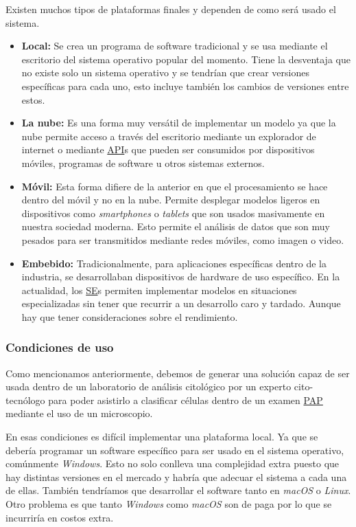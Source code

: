 Existen muchos tipos de plataformas finales y dependen de como será usado
el sistema. 

\begin{itemize}
    \item{\textbf{Local: }} Se crea un programa de software tradicional y se usa
    mediante el escritorio del sistema operativo popular del momento. Tiene la
    desventaja que no existe solo un sistema operativo y se tendrían que crear
    versiones específicas para cada uno, esto incluye también los cambios de
    versiones entre estos.
    \item{\textbf{La nube: }} Es una forma muy versátil de implementar un modelo
    ya que la nube permite acceso a través del escritorio mediante un explorador
    de internet o mediante \hyperlink{abbr}{API}s que pueden ser consumidos por
    dispositivos móviles, programas de software u otros sistemas externos.
    \item{\textbf{Móvil: }} Esta forma difiere de la anterior en que el
    procesamiento se hace dentro del móvil y no en la nube. Permite desplegar
    modelos ligeros en dispositivos como \emph{smartphones} o \emph{tablets} que
    son usados masivamente en nuestra sociedad moderna. Esto permite el análisis
    de datos que son muy pesados para ser transmitidos mediante redes móviles,
    como imagen o video.
    \item{\textbf{Embebido: }} Tradicionalmente, para aplicaciones específicas
    dentro de la industria, se desarrollaban dispositivos de hardware de uso
    específico. En la actualidad, los \hyperlink{abbr}{SE}s permiten implementar
    modelos en situaciones especializadas sin tener que recurrir a un desarrollo
    caro y tardado. Aunque hay que tener consideraciones sobre el rendimiento.
\end{itemize}

\subsubsection{Condiciones de uso}
Como mencionamos anteriormente, debemos de generar una solución capaz de ser
usada dentro de un laboratorio de análisis citológico por un experto
cito-tecnólogo para poder asistirlo a clasificar células dentro de un examen
\hyperlink{abbr}{PAP} mediante el uso de un microscopio.

En esas condiciones es difícil implementar una plataforma local. Ya que se
debería programar un software específico para ser usado en el sistema operativo,
comúnmente \emph{Windows}. Esto no solo conlleva una complejidad extra puesto
que hay distintas versiones en el mercado y habría que adecuar el sistema a cada
una de ellas. También tendríamos que desarrollar el software tanto en
\emph{macOS} o \emph{Linux}. Otro problema es que tanto \emph{Windows} como
\emph{macOS} son de paga por lo que se incurriría en costos extra.

